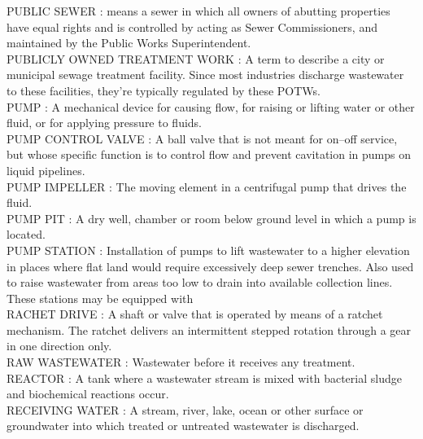 \vspace{0.15cm}
PUBLIC SEWER :  means a sewer in which all owners of abutting properties have equal rights and is controlled by acting as Sewer Commissioners, and maintained by the Public Works Superintendent. \\
\vspace{0.15cm}
PUBLICLY OWNED TREATMENT WORK :   A term to describe a city or municipal sewage treatment facility. Since most industries discharge wastewater to these facilities, they’re typically regulated by these POTWs.\\
\vspace{0.15cm}
PUMP :  A mechanical device for causing flow, for raising or lifting water or other fluid, or for applying pressure to fluids. \\
\vspace{0.15cm}
PUMP CONTROL VALVE :   A ball valve that is not meant for on–off service, but whose specific function is to control flow and prevent cavitation in pumps on liquid pipelines.\\
\vspace{0.15cm}
PUMP IMPELLER :   The moving element in a centrifugal pump that drives the fluid.\\
\vspace{0.15cm}
PUMP PIT :  A dry well, chamber or room below ground level in which a pump is located. \\
\vspace{0.15cm}
PUMP STATION :  Installation of pumps to lift wastewater to a higher elevation in places where flat land would require excessively deep sewer trenches. Also used to raise wastewater from areas too low to drain into available collection lines. These stations may be equipped with \\
\vspace{0.15cm}
RACHET DRIVE :   A shaft or valve that is operated by means of a ratchet mechanism. The ratchet delivers an intermittent stepped rotation through a gear in one direction only.\\
\vspace{0.15cm}
RAW WASTEWATER :   Wastewater before it receives any treatment.\\
\vspace{0.15cm}
REACTOR :   A tank where a wastewater stream is mixed with bacterial sludge and biochemical reactions occur.\\
\vspace{0.15cm}
RECEIVING WATER :  A stream, river, lake, ocean or other surface or groundwater into which treated or untreated wastewater is discharged.\\
